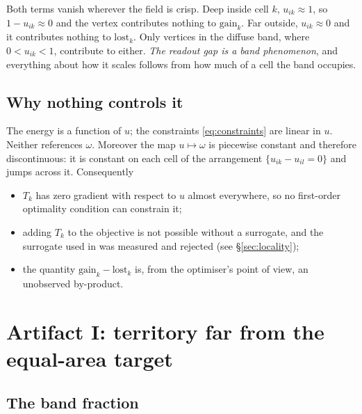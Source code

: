 \documentclass[11pt,a4paper]{article}
\begin{document}
\begin{remark}
Both terms vanish wherever the field is crisp. Deep inside cell $k$,
$u_{ik} \approx 1$, so $1 - u_{ik} \approx 0$ and the vertex contributes nothing
to $\mathrm{gain}_k$. Far outside, $u_{ik} \approx 0$ and it contributes nothing to
$\mathrm{lost}_k$. Only vertices in the diffuse band, where $0 < u_{ik} < 1$, contribute
to either. \emph{The readout gap is a band phenomenon}, and everything about how
it scales follows from how much of a cell the band occupies.
\end{remark}

\subsection{Why nothing controls it}

The energy is a function of $u$; the constraints \eqref{eq:constraints} are linear
in $u$. Neither references $\omega$. Moreover the map $u \mapsto \omega$ is
piecewise constant and therefore discontinuous: it is constant on each cell of the
arrangement $\{u_{ik} - u_{il} = 0\}$ and jumps across it. Consequently
\begin{itemize}\itemsep2pt
  \item $T_k$ has zero gradient with respect to $u$ almost everywhere, so no
    first-order optimality condition can constrain it;
  \item adding $T_k$ to the objective is not possible without a surrogate, and the
    surrogate used in  was measured and
    rejected (see \S\ref{sec:locality});
  \item the quantity $\mathrm{gain}_k - \mathrm{lost}_k$ is, from the optimiser's point of view,
    an unobserved by-product.
\end{itemize}

\section{Artifact I: territory far from the equal-area target}
\label{sec:artifact1}

\subsection{The band fraction}
\end{document}
